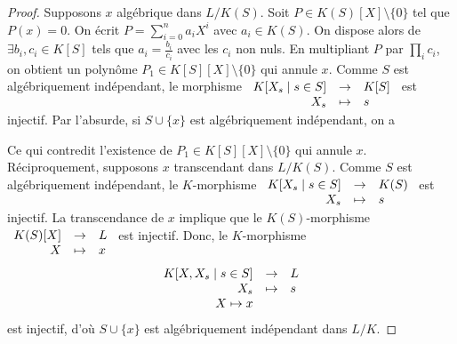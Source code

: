 \documentclass{article}
\newcommand{\applic}[4]{\begin{array}[t]{rcl}
#1 & \to & #2 \\
#3 & \mapsto & #4
\end{array}}
\theoremstyle{plain}
\theoremstyle{definition}
\theoremstyle{remark}
\begin{document}
\begin{proof}
    Supposons $x$ algébrique dans $L/K(S)$. Soit $P \in K(S)[X] \setminus \{0\}$ tel que $P(x) = 0$. On écrit $P = \sum\limits_{i=0}^n a_i X^i$ avec $a_i \in K(S)$. On dispose alors de $\exists b_i, c_i \in K[S]$ tels que $a_i = \frac{b_i}{c_i}$ avec les $c_i$ non nuls. En multipliant $P$ par $\prod\limits_{i} c_i$, on obtient un polynôme $P_1 \in K[S][X] \setminus\{0\}$ qui annule $x$. Comme $S$ est algébriquement indépendant, le morphisme $\applic{K[X_s \mid s \in S]}{K[S]}{X_s}{s}$ est injectif. Par l'absurde, si $S \cup \{x\}$ est algébriquement indépendant, on a
    \begin{center}
    \end{center}
    Ce qui contredit l'existence de $P_1 \in K[S][X] \setminus\{0\}$ qui annule $x$. \\
    Réciproquement, supposons $x$ transcendant dans $L/K(S)$. Comme $S$ est algébriquement indépendant, le $K$-morphisme $\applic{K[X_s \mid s\in S]}{K(S)}{X_s}{s}$ est injectif. La transcendance de $x$ implique que le $K(S)$-morphisme $\applic{K(S)[X]}{L}{X}{x}$ est injectif. Donc, le $K$-morphisme
    \[
        \begin{array}[t]{rcl}
            K[X,X_s \mid s\in S] & \to & L \\
            X_s & \mapsto & s \\
            X \mapsto x
            \end{array}
    \]
    est injectif, d'où $S \cup \{x\}$ est algébriquement indépendant dans $L/K$.
\end{proof}
\end{document}
